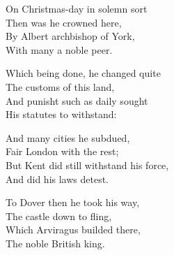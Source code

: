 \settowidth{\versewidth}{Which being done, he changed quite}
\begin{dcverse}\begin{altverse}
On Christmas-day in solemn sort\\
Then was he crowned here,\\
By Albert archbishop of York,\\
With many a noble peer.
\end{altverse}

\begin{altverse}
Which being done, he changed quite\\
The customs of this land,\\
And punisht such as daily sought\\
His statutes to withstand:
\end{altverse}

\begin{altverse}
And many cities he subdued,\\
Fair London with the rest;\\
But Kent did still withstand his force,\\
And did his laws detest.
\end{altverse}

\begin{altverse}
To Dover then he took his way,\\
The castle down to fling,\\
Which Arviragus builded there,\\
The noble British king.
\end{altverse}
\end{dcverse}

\pagebreak

